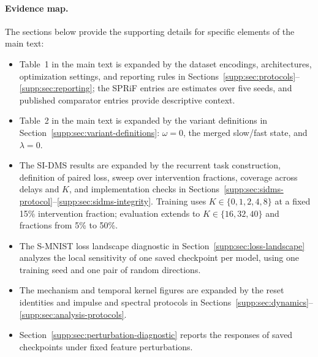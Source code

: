 \documentclass[letterpaper]{article}
\begin{document}
\paragraph{Evidence map.}
The sections below provide the supporting details for specific elements of the main text:
\begin{itemize}
\item Table~1 in the main text is expanded by the dataset encodings, architectures, optimization settings, and reporting rules in Sections~\ref{supp:sec:protocols}--\ref{supp:sec:reporting}; the SPRiF entries are estimates over five seeds, and published comparator entries provide descriptive context.
\item Table~2 in the main text is expanded by the variant definitions in Section~\ref{supp:sec:variant-definitions}: $\omega=0$, the merged slow/fast state, and $\lambda=0$.
\item The SI-DMS results are expanded by the recurrent task construction, definition of paired loss, sweep over intervention fractions, coverage across delays and $K$, and implementation checks in Sections~\ref{supp:sec:sidms-protocol}--\ref{supp:sec:sidms-integrity}. Training uses $K\in\{0,1,2,4,8\}$ at a fixed 15\% intervention fraction; evaluation extends to $K\in\{16,32,40\}$ and fractions from 5\% to 50\%.
\item The S-MNIST loss landscape diagnostic in Section~\ref{supp:sec:loss-landscape} analyzes the local sensitivity of one saved checkpoint per model, using one training seed and one pair of random directions.
\item The mechanism and temporal kernel figures are expanded by the reset identities and impulse and spectral protocols in Sections~\ref{supp:sec:dynamics}--\ref{supp:sec:analysis-protocols}.
\item Section~\ref{supp:sec:perturbation-diagnostic} reports the responses of saved checkpoints under fixed feature perturbations.
\end{itemize}
\end{document}
